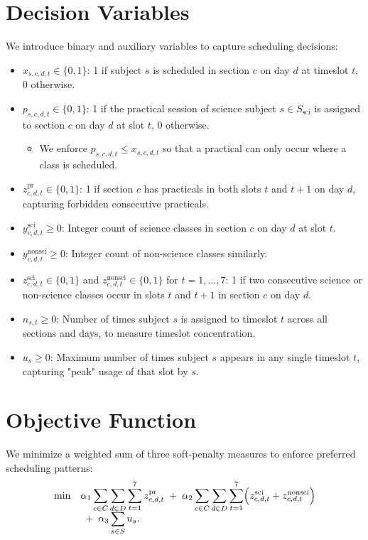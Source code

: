 \documentclass[11pt]{article}
\begin{document}
\section{Decision Variables}
We introduce binary and auxiliary variables to capture scheduling decisions:
\begin{itemize}
  \item $x_{s,c,d,t} \in \{0,1\}$: 1 if subject $s$ is scheduled in section $c$ on day $d$ at timeslot $t$, 0 otherwise.  
  \item $p_{s,c,d,t} \in \{0,1\}$: 1 if the practical session of science subject $s\in S_{\mathrm{sci}}$ is assigned to section $c$ on day $d$ at slot $t$, 0 otherwise.
    \begin{itemize}
      \item We enforce $p_{s,c,d,t} \le x_{s,c,d,t}$ so that a practical can only occur where a class is scheduled.  
    \end{itemize}
  \item $z^{\mathrm{pr}}_{c,d,t} \in \{0,1\}$: 1 if section $c$ has practicals in both slots $t$ and $t+1$ on day $d$, capturing forbidden consecutive practicals.  
  \item $y^{\mathrm{sci}}_{c,d,t} \ge 0$: Integer count of science classes in section $c$ on day $d$ at slot $t$.  
  \item $y^{\mathrm{nonsci}}_{c,d,t} \ge 0$: Integer count of non-science classes similarly.  
  \item $z^{\mathrm{sci}}_{c,d,t} \in \{0,1\}$ and $z^{\mathrm{nonsci}}_{c,d,t} \in \{0,1\}$ for $t=1,\dots,7$: 1 if two consecutive science or non-science classes occur in slots $t$ and $t+1$ in section $c$ on day $d$.  
  \item $n_{s,t} \ge 0$: Number of times subject $s$ is assigned to timeslot $t$ across all sections and days, to measure timeslot concentration.  
  \item $u_s \ge 0$: Maximum number of times subject $s$ appears in any single timeslot $t$, capturing "peak" usage of that slot by $s$.  
\end{itemize}

\section{Objective Function}
We minimize a weighted sum of three soft-penalty measures to enforce preferred scheduling patterns:
\begin{align*}
\min \quad & \alpha_1 \sum_{c\in C}\sum_{d\in D}\sum_{t=1}^{7} z^{\mathrm{pr}}_{c,d,t} \; + \;
               \alpha_2 \sum_{c\in C}\sum_{d\in D}\sum_{t=1}^{7} \Bigl(z^{\mathrm{sci}}_{c,d,t} + z^{\mathrm{nonsci}}_{c,d,t}\Bigr) \\[-0.5em]
           & \; + \; \alpha_3 \sum_{s\in S} u_s.
\end{align*}
\end{document}
